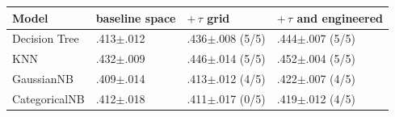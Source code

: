 \begin{tabular}{@{}llll@{}}
\toprule
Model & baseline space & $+\,\tau$ grid & $+\,\tau$ and engineered \\
\midrule
Decision Tree & .413$\pm$.012 & .436$\pm$.008 (5/5) & .444$\pm$.007 (5/5) \\
KNN & .432$\pm$.009 & .446$\pm$.014 (5/5) & .452$\pm$.004 (5/5) \\
GaussianNB & .409$\pm$.014 & .413$\pm$.012 (4/5) & .422$\pm$.007 (4/5) \\
CategoricalNB & .412$\pm$.018 & .411$\pm$.017 (0/5) & .419$\pm$.012 (4/5) \\
\bottomrule
\end{tabular}
